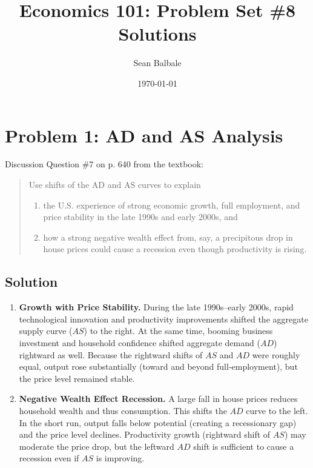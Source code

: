 \documentclass{article}
\title{Economics 101: Problem Set \#8 Solutions}
\author{Sean Balbale}
\date{\today}
\begin{document}
\maketitle

\section*{Problem 1: AD and AS Analysis}
Discussion Question \#7 on p. 640 from the textbook:
\begin{quote}
  Use shifts of the AD and AS curves to explain
  \begin{enumerate}[label=(\alph*)]
    \item the U.S. experience of strong economic growth, full employment, and price stability in the late 1990s and early 2000s, and
    \item how a strong negative wealth effect from, say, a precipitous drop in house prices could cause a recession even though productivity is rising.
  \end{enumerate}
\end{quote}

\subsection*{Solution}

\begin{enumerate}[label=(\alph*)]
  \item \textbf{Growth with Price Stability.}
        During the late 1990s–early 2000s, rapid technological innovation and productivity improvements shifted the aggregate supply curve (\(AS\)) to the right. At the same time, booming business investment and household confidence shifted aggregate demand (\(AD\)) rightward as well. Because the rightward shifts of \(AS\) and \(AD\) were roughly equal, output rose substantially (toward and beyond full‐employment), but the price level remained stable.

  \item \textbf{Negative Wealth Effect Recession.}
        A large fall in house prices reduces household wealth and thus consumption. This shifts the \(AD\) curve to the left. In the short run, output falls below potential (creating a recessionary gap) and the price level declines. Productivity growth (rightward shift of \(AS\)) may moderate the price drop, but the leftward \(AD\) shift is sufficient to cause a recession even if \(AS\) is improving.
\end{enumerate}
\end{document}
